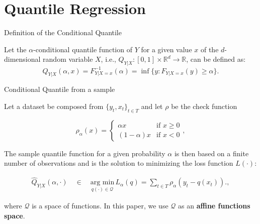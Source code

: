 \section{Quantile Regression}\label{quantile-regression}

\begin{frame}{Definition of the Conditional Quantile}

Let the \(\alpha\)-conditional quantile function of \(Y\) for a given
value \(x\) of the \(d\)-dimensional random variable \(X\), i.e.,
\(Q_{Y|X}:[0,1] \times \mathbb{R}^d \rightarrow \mathbb{R}\), can be
defined as:
\[Q_{Y|X}(\alpha,x) = F_{Y|X=x}^{-1}(\alpha) = \inf\{y: F_{Y|X=x}(y) \geq \alpha\}.\]

\end{frame}

\begin{frame}{Conditional Quantile from a sample}

Let a dataset be composed from \(\{y_t,x_t \}_{t \in T}\) and let
\(\rho\) be the check function

\begin{equation}\label{eq:check-function}
\rho_{\alpha}(x)=\begin{cases}
\alpha x & \text{if }x\geq0\\
(1-\alpha)x & \text{if }x<0
\end{cases},
\end{equation}

The sample quantile function for a given probability \(\alpha\) is then
based on a finite number of observations and is the solution to
minimizing the loss function \(L(\cdot)\):

\begin{eqnarray}
\hat{Q}_{Y|X}(\alpha,\cdot)\quad\in\quad  \underset{q(\cdot)\in\mathcal{Q}}{\text{arg min}}\, L_\alpha(q) = \sum_{t\in T}\rho_{\alpha}(y_{t}-q(x_t)).\label{eq:optim-lqr1}, 
\end{eqnarray}

where \(\mathcal{Q}\) is a space of functions. In this paper, we use
\(\mathcal{Q}\) as an \textbf{affine functions space}.

\end{frame}

